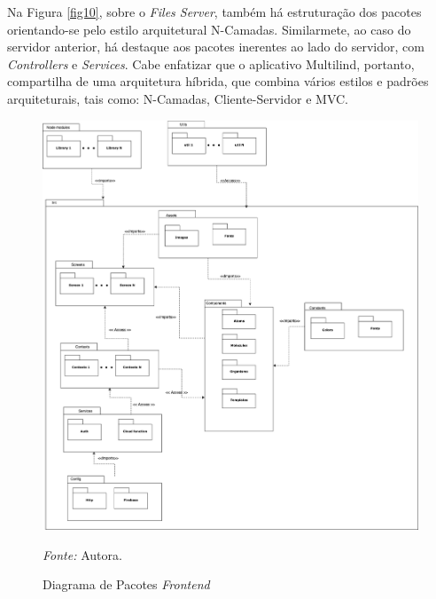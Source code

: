 Na Figura \ref{fig10}, sobre o \textit{Files Server}, também há estruturação dos pacotes orientando-se pelo estilo arquitetural N-Camadas. Similarmete, ao caso do servidor anterior, há destaque aos pacotes inerentes ao lado do servidor, com \textit{Controllers} e \textit{Services}. Cabe enfatizar que o aplicativo Multilind, portanto, compartilha de 
uma arquitetura híbrida, que combina vários estilos e padrões arquiteturais, tais como: N-Camadas, Cliente-Servidor e MVC.

\begin{figure}[h]
	\centering
	\caption{Diagrama de Pacotes \textit{Frontend}}
	\begin{adjustbox}{center}
		\includegraphics[width=1\textwidth]{figuras/frontend.eps}
	\end{adjustbox}
	\begin{tablenotes}[flushleft]
		\centering
		\item \textit{Fonte:} Autora.
	\end{tablenotes}
	\label{fig08}
\end{figure}

\pagebreak


